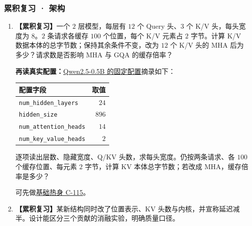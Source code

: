 \subsubsection*{累积复习 · 架构}
\begin{enumerate}[label={},leftmargin=4.8em,itemsep=4pt]
\item[\textbf{R-13.}] \leavevmode{}\label{exercise:R-13}\label{exercise:review-gqa-budget}\textbf{【累积复习】}一个 $2$ 层模型，每层有 $12$ 个 Query 头、$3$ 个 K/V 头，每头宽度为 $8$。$2$ 条请求各缓存 $100$ 个位置，每个 K/V 元素占 $2$ 字节。计算 K/V 数据本体的总字节数；保持其余条件不变，改为 $12$ 个 K/V 头的 MHA 后为多少？请求数是否影响 MHA 与 GQA 的缓存倍率？
\par\textbf{再读真实配置：}\hyperref[source:qwen-config]{Qwen2.5-0.5B 的固定配置}摘录如下：
\begin{center}\small
{}
\begin{tabular}{@{}lr@{}}\toprule
配置字段 & 取值\\\midrule
\texttt{num\_hidden\_layers} & $24$\\
\texttt{hidden\_size} & $896$\\
\texttt{num\_attention\_heads} & $14$\\
\texttt{num\_key\_value\_heads} & $2$\\\bottomrule
\end{tabular}
\end{center}
逐项读出层数、隐藏宽度、Q/KV 头数，求每头宽度。仍按两条请求、各 $100$ 个缓存位置、每元素 $2$ 字节，计算 KV 本体总字节数；若改成 MHA，缓存倍率是多少？\par 可先做\hyperref[exercise:moe-routing]{基础热身 C-115}。
\item[\textbf{R-14.}] \leavevmode{}\label{exercise:R-14}\label{exercise:review-architecture-ablation}\textbf{【累积复习】}某新结构同时改了位置表示、KV 头数与内核，并宣称延迟减半。设计能区分三个贡献的消融实验，明确质量口径。
\end{enumerate}
